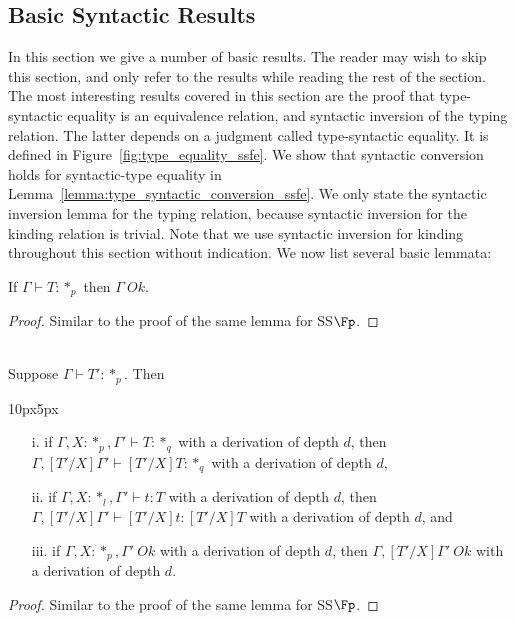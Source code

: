 \subsection{Basic Syntactic Results}
\label{subsec:basic_syntactic_lemmas_ssfe}
In this section we give a number of basic results.  The reader may
wish to skip this section, and only refer to the results while reading
the rest of the section.  The most interesting results covered in this
section are the proof that type-syntactic equality is an equivalence
relation, and syntactic inversion of the typing relation.  The latter
depends on a judgment called type-syntactic equality.  It is defined
in Figure~\ref{fig:type_equality_ssfe}.  We show that syntactic
conversion holds for syntactic-type equality in
Lemma~\ref{lemma:type_syntactic_conversion_ssfe}.  We only state the
syntactic inversion lemma for the typing relation, because syntactic
inversion for the kinding relation is trivial.  Note that we use
syntactic inversion for kinding throughout this section without
indication.  We now list several basic lemmata:
\begin{lemma}
  If $\Gamma \vdash T:*_p$ then $\Gamma\ Ok$.
  \label{lemma:kinding_ok_ssfe}
\end{lemma}
\begin{proof}
  Similar to the proof of the same lemma for SS$\Fp$.
\end{proof}
\begin{lemma}
  \,\\Suppose $\Gamma \vdash T':*_p$.  Then
  \vspace{-25px}
  \begin{changemargin}{10px}{5px}\noindent
  \begin{itemize}
  \item[i.] if $\Gamma,X:*_p,\Gamma' \vdash T:*_q$ with a
    derivation of depth $d$, then $\Gamma,[T'/X]\Gamma' \vdash
    [T'/X]T:*_q$ with a derivation of depth $d$,
    
  \item[ii.] if $\Gamma, X:*_l,\Gamma' \vdash t:T$ with a
    derivation of depth $d$, then $\Gamma,[T'/X]\Gamma' \vdash
    [T'/X]t:[T'/X]T$ with a derivation of depth $d$, and
    
  \item[iii.] if $\Gamma,X:*_p,\Gamma'\ Ok$ with a derivation of depth $d$, then 
    $\Gamma,[T'/X]\Gamma'\ Ok$ with a derivation of depth $d$.
  \end{itemize}
  \end{changemargin}
  \label{lemma:substitution_for_kinding_ssfe}
\end{lemma}
\begin{proof}
  Similar to the proof of the same lemma for SS$\Fp$.
\end{proof}

